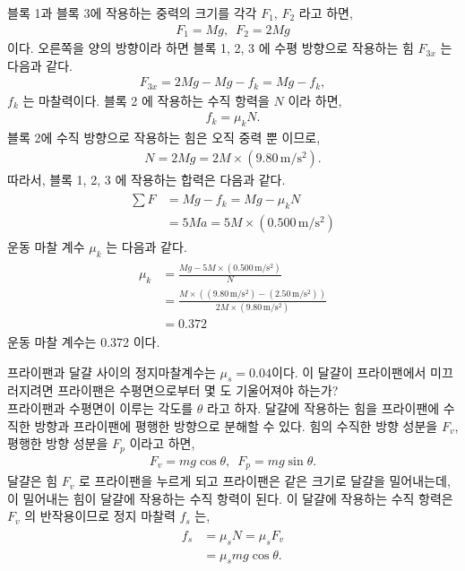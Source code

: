 \documentclass[floatfix,nofootinbib,superscriptaddress,fleqn]{revtex4-2}
\begin{document}
블록 1과 블록 3에 작용하는 중력의 크기를 각각 $F_1$, $F_2$ 라고 하면,
\begin{align}
  F_1 = Mg,\,\,\, F_2 = 2Mg
\end{align}
이다. 오른쪽을 양의 방향이라 하면 블록 1, 2, 3 에 수평 방향으로 작용하는 힘 $F_{3x}$ 는 
다음과 같다. 
\begin{align}
  F_{3x} = 2Mg - Mg - f_k = Mg - f_k,
\end{align}
$f_k$ 는 마찰력이다. 블록 2 에 작용하는 수직 항력을 $N$ 이라 하면,
\begin{align}
  f_k = \mu_kN.
\end{align}
블록 2에 수직 방향으로 작용하는 힘은 오직 중력 뿐 이므로, 
\begin{align}
  N = 2Mg = 2M\times(9.80\,\mathrm{m/s^2}).
\end{align}
따라서, 블록 1, 2, 3 에 작용하는 합력은 다음과 같다.
\begin{align}
  \begin{split}
    \sum F &= Mg - f_k = Mg - \mu_kN \\
    &= 5Ma= 5M \times (0.500\,\mathrm{m/s^2})
  \end{split}
\end{align}
운동 마찰 계수 $\mu_k$ 는 다음과 같다.
\begin{align}
  \begin{split}
    \mu_k &= \frac{Mg - 5M \times (0.500\,\mathrm{m/s^2})}{N} \\
    &= \frac{M\times((9.80\,\mathrm{m/s^2})-(2.50\,\mathrm{m/s^2}))}
    {2M\times(9.80\,\mathrm{m/s^2})}  \\
    &= 0.372
  \end{split}
\end{align}
운동 마찰 계수는 0.372 이다.


\vspace{2cm}

 프라이팬과 달걀 사이의 정지마찰계수는
$\mu_s=0.04$이다. 이 달걀이 프라이팬에서 미끄러지려면 프라이팬은
수평면으로부터 몇 도 기울어져야 하는가?  \\


프라이팬과 수평면이 이루는 각도를 $\theta$ 라고 하자. 달걀에 작용하는 힘을
프라이팬에 수직한 방향과 프라이팬에 평행한 방향으로 분해할 수 있다. 힘의 수직한
방향 성분을 $F_v$, 평행한 방향 성분을 $F_p$ 이라고 하면,
\begin{align}
F_v = mg\cos{\theta},\,\,\,F_p = mg\sin{\theta}  .
\end{align}
달걀은 힘 $F_v$ 로 프라이팬을 누르게 되고 프라이팬은 같은 크기로 달걀을 밀어내는데,
이 밀어내는 힘이 달걀에 작용하는 수직 항력이 된다.
이 달걀에 작용하는 수직 항력은 $F_v$ 의 반작용이므로 정지 마찰력 $f_s$ 는,
\begin{align}
  \begin{split}
    f_s &= \mu_s N = \mu_s F_v \\
    &= \mu_s mg\cos{\theta}.
  \end{split}
\end{align} 
\end{document}
